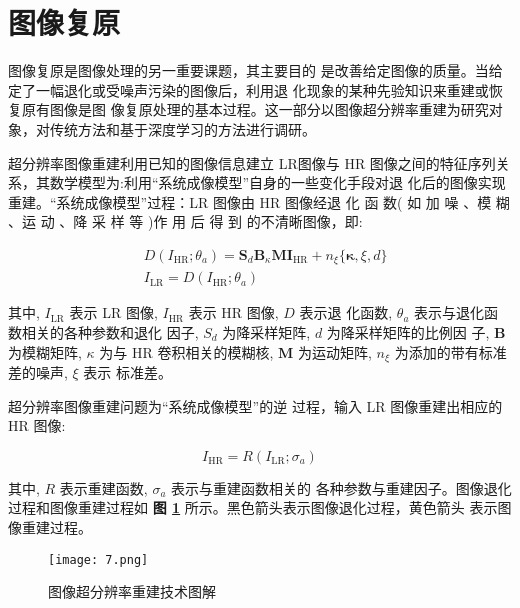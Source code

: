 \section{图像复原}
\label{sec:image_restoration}

图像复原是图像处理的另一重要课题，其主要目的 是改善给定图像的质量。当给定了一幅退化或受噪声污染的图像后，利用退 化现象的某种先验知识来重建或恢复原有图像是图 像复原处理的基本过程。这一部分以图像超分辨率重建为研究对象，对传统方法和基于深度学习的方法进行调研。

超分辨率图像重建利用已知的图像信息建立 LR图像与 HR 图像之间的特征序列关系，其数学模型为:利用``系统成像模型''自身的一些变化手段对退 化后的图像实现重建。``系统成像模型''过程：LR 图像由 HR 图像经退 化 函 数( 如 加 噪 、模 糊 、运 动 、降 采 样 等 )作 用 后 得 到 的不清晰图像，即:

\begin{equation}
\begin{aligned}
& D\left(I_{\mathrm{HR}} ; \theta_a\right)=\boldsymbol{S}_d \boldsymbol{B}_\kappa \boldsymbol{M} \boldsymbol{I}_{\mathrm{HR}}+n_{\xi}\{\boldsymbol{\kappa}, \xi, d\} \\
& I_{\mathrm{LR}}=D\left(I_{\mathrm{HR}} ; \theta_a\right)
\end{aligned}
\end{equation}

其中, $I_{\mathrm{LR}}$ 表示 LR 图像, $I_{\mathrm{HR}}$ 表示 $\mathrm{HR}$ 图像, $D$ 表示退 化函数, $\theta_a$ 表示与退化函数相关的各种参数和退化 因子, $S_d$ 为降采样矩阵, $d$ 为降采样矩阵的比例因 子, $\boldsymbol{B}$ 为模糊矩阵, $\kappa$ 为与 $\mathrm{HR}$ 卷积相关的模糊核, $\boldsymbol{M}$ 为运动矩阵, $n_{\xi}$ 为添加的带有标准差的噪声, $\xi$ 表示 标准差。

超分辨率图像重建问题为“系统成像模型”的逆 过程，输入 LR 图像重建出相应的 HR 图像:

\begin{equation}
I_{\mathrm{HR}}=R\left(I_{\mathrm{LR}} ; \sigma_a\right)
\end{equation}

其中, $R$ 表示重建函数, $\sigma_a$ 表示与重建函数相关的 各种参数与重建因子。图像退化过程和图像重建过程如 \textbf{图 \ref{fig:fig7}} 所示。黑色箭头表示图像退化过程，黄色箭头 表示图像重建过程。

\begin{figure}[!t]
\centering
\texttt{[image: 7.png]}	
\caption{图像超分辨率重建技术图解}
\label{fig:fig7}
\end{figure}

